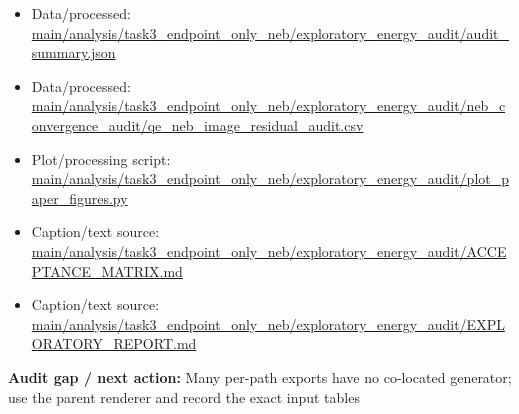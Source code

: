 \documentclass[10pt]{article}
\newcommand{\statusline}[1]{\colorbox{gray!12}{\parbox{0.96\linewidth}{#1}}}
\begin{document}
\begin{itemize}[leftmargin=1.4em,noitemsep]
\item Data/processed: \begingroup\scriptsize\url{main/analysis/task3_endpoint_only_neb/exploratory_energy_audit/audit_summary.json}\endgroup
\item Data/processed: \begingroup\scriptsize\url{main/analysis/task3_endpoint_only_neb/exploratory_energy_audit/neb_convergence_audit/qe_neb_image_residual_audit.csv}\endgroup
\item Plot/processing script: \begingroup\scriptsize\url{main/analysis/task3_endpoint_only_neb/exploratory_energy_audit/plot_paper_figures.py}\endgroup
\item Caption/text source: \begingroup\scriptsize\url{main/analysis/task3_endpoint_only_neb/exploratory_energy_audit/ACCEPTANCE_MATRIX.md}\endgroup
\item Caption/text source: \begingroup\scriptsize\url{main/analysis/task3_endpoint_only_neb/exploratory_energy_audit/EXPLORATORY_REPORT.md}\endgroup
\end{itemize}
\statusline{\textbf{Audit gap / next action:} Many per-path exports have no co-located generator; use the parent renderer and record the exact input tables}
\vfill
\clearpage
\end{document}
